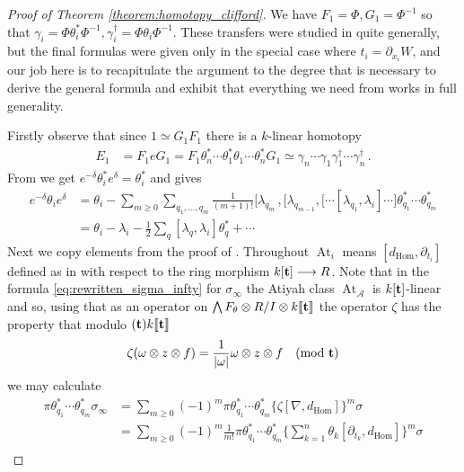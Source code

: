 \documentclass[english,letter paper,12pt,leqno]{article}
\theoremstyle{example}
\numberwithin{equation}{section}
\def\AA{\mathcal{A}}
\def\Hom{\operatorname{Hom}}
\DeclareMathOperator{\At}{At}
\DeclareMathOperator{\vAt}{At}
\begin{document}
\begin{proof}[Proof of Theorem \ref{theorem:homotopy_clifford}] We have $F_1 = \Phi, G_1 = \Phi^{-1}$ so that $\gamma_i = \Phi \theta_i^* \Phi^{-1}, \gamma^\dagger_i = \Phi \theta_i \Phi^{-1}$. These transfers were studied in \cite{cut} quite generally, but the final formulas were given only in the special case where $t_i = \partial_{x_i} W$, and our job here is to recapitulate the argument to the degree that is necessary to derive the general formula and exhibit that everything we need from \cite{cut} works in full generality.

Firstly observe that since $1 \simeq G_1 F_1$ there is a $k$-linear homotopy
\begin{align*}
E_1 &= F_1 e G_1 = F_1 \theta_n^* \cdots \theta_1^* \theta_1 \cdots \theta_n^* G_1 \simeq \gamma_n \cdots \gamma_1 \gamma_1^\dagger \cdots \gamma_n^\dagger\,.
\end{align*}
From \cite[Lemma 4.17]{cut} we get $e^{-\delta} \theta_i^* e^{\delta} = \theta_i^*$ and \cite[Theorem 4.28]{cut} gives
\begin{align*}
e^{-\delta} \theta_i e^{\delta} &= \theta_i - \sum_{m \ge 0} \sum_{q_1,\ldots,q_m} \frac{1}{(m+1)!} \big[ \lambda_{q_m}\,, \big[ \lambda_{q_{m-1}}, \big[ \cdots [ \lambda_{q_1}, \lambda_i ] \cdots \big] \theta^*_{q_1} \cdots \theta^*_{q_m}\\
&= \theta_i - \lambda_i - \frac{1}{2} \sum_q [\lambda_q, \lambda_i] \theta_q^* + \cdots
\end{align*}
Next we copy elements from the proof of \cite[Proposition 4.35]{cut}. Throughout $\At_i$ means $[d_{\Hom}, \partial_{t_i}]$ defined as in \cite{pushforward} with respect to the ring morphism $k[\bold{t}] \longrightarrow R$. Note that in the formula \eqref{eq:rewritten_sigma_infty} for $\sigma_\infty$ the Atiyah class $\vAt_{\AA}$ is $k[\bold{t}]$-linear and so, using that as an operator on $\bigwedge F_\theta \otimes R/I \otimes k\llbracket \bold{t} \rrbracket$ the operator $\zeta$ has the property that modulo $(\bold{t}) k\llbracket \bold{t} \rrbracket$
\[
\zeta( \omega \otimes z \otimes f ) = \frac{1}{|\omega|} \omega \otimes z \otimes f \quad \text{(mod $\bold{t}$)}
\]
we may calculate
\begin{align*}
\pi \theta_{q_1}^* \cdots \theta_{q_m}^* \sigma_\infty &= \sum_{m \ge 0} (-1)^m \pi \theta_{q_1}^* \cdots \theta_{q_m}^* \Big\{ \zeta [\nabla, d_{\Hom}] \Big\}^m \sigma\\
&= \sum_{m \ge 0} (-1)^m \frac{1}{m!} \pi \theta_{q_1}^* \cdots \theta_{q_m}^* \Big\{ \sum_{k=1}^n \theta_k [\partial_{t_k}, d_{\Hom}] \Big\}^m \sigma\\

\end{align*}
\end{proof}
\end{document}
